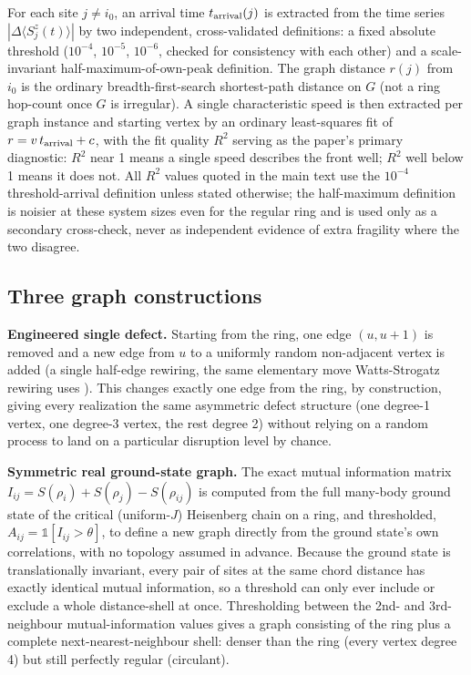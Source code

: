 \documentclass[11pt]{article}
\begin{document}
For each site $j\neq i_0$, an arrival time $t_{\rm arrival}(j)$ is extracted from the time series $|\Delta\langle S^z_j(t)\rangle|$ by two independent, cross-validated definitions: a fixed absolute threshold ($10^{-4}$, $10^{-5}$, $10^{-6}$, checked for consistency with each other) and a scale-invariant half-maximum-of-own-peak definition. The graph distance $r(j)$ from $i_0$ is the ordinary breadth-first-search shortest-path distance on $G$ (not a ring hop-count once $G$ is irregular). A single characteristic speed is then extracted per graph instance and starting vertex by an ordinary least-squares fit of $r=v\,t_{\rm arrival}+c$, with the fit quality $R^2$ serving as the paper's primary diagnostic: $R^2$ near 1 means a single speed describes the front well; $R^2$ well below 1 means it does not. All $R^2$ values quoted in the main text use the $10^{-4}$ threshold-arrival definition unless stated otherwise; the half-maximum definition is noisier at these system sizes even for the regular ring and is used only as a secondary cross-check, never as independent evidence of extra fragility where the two disagree.

\subsection{Three graph constructions}

\textbf{Engineered single defect.} Starting from the ring, one edge $(u,u+1)$ is removed and a new edge from $u$ to a uniformly random non-adjacent vertex is added (a single half-edge rewiring, the same elementary move Watts-Strogatz rewiring uses \cite{WattsStrogatz1998}). This changes exactly one edge from the ring, by construction, giving every realization the same asymmetric defect structure (one degree-1 vertex, one degree-3 vertex, the rest degree 2) without relying on a random process to land on a particular disruption level by chance.

\textbf{Symmetric real ground-state graph.} The exact mutual information matrix $I_{ij}=S(\rho_i)+S(\rho_j)-S(\rho_{ij})$ is computed from the full many-body ground state of the critical (uniform-$J$) Heisenberg chain on a ring, and thresholded, $A_{ij}=\mathbb{1}[I_{ij}>\theta]$, to define a new graph directly from the ground state's own correlations, with no topology assumed in advance. Because the ground state is translationally invariant, every pair of sites at the same chord distance has exactly identical mutual information, so a threshold can only ever include or exclude a whole distance-shell at once. Thresholding between the 2nd- and 3rd-neighbour mutual-information values gives a graph consisting of the ring plus a complete next-nearest-neighbour shell: denser than the ring (every vertex degree 4) but still perfectly regular (circulant).
\end{document}
